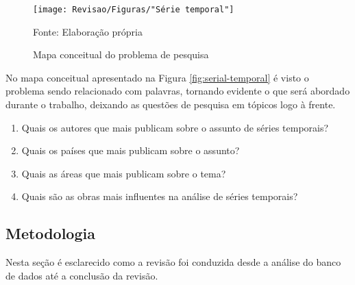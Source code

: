 \begin{figure}[H]
	\centering
	\caption{Mapa conceitual do problema de pesquisa}
	\label{fig:serie-temporal}
	\texttt{[image: Revisao/Figuras/"Série temporal"]}
	
	Fonte: Elaboração própria 
\end{figure}

No mapa conceitual apresentado na Figura \ref{fig:serial-temporal} é visto o problema sendo relacionado com palavras, tornando evidente o que será abordado durante o trabalho, deixando as questões de pesquisa em tópicos logo à frente.

\begin{enumerate}[start=1, label = {\textbf{Q} \arabic* } ]
	\item \label{questão:rev1}Quais os autores que mais publicam sobre o assunto de séries temporais?
	\item \label{questão:rev2}Quais os países que mais publicam sobre o assunto? 
	\item \label{questão:rev3}Quais as áreas que mais publicam sobre o tema?
	\item \label{questão:rev4}Quais são as obras mais influentes na análise de séries temporais?
\end{enumerate}

\subsection{Metodologia}\label{subsec:met da revisão}

Nesta seção é esclarecido como a revisão foi conduzida desde a análise do banco de dados até a conclusão da revisão.

